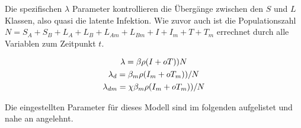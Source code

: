 \documentclass[paper=a4, fontsize=11pt, ngerman, abstract=on]{scrartcl}
\numberwithin{equation}{section} %
\numberwithin{figure}{section} %
\numberwithin{table}{section} %
\begin{document}
Die spezifischen $\lambda$ Parameter kontrollieren die Übergänge zwischen den $S$ und $L$ Klassen, also quasi die latente Infektion. Wie zuvor auch ist die Populationszahl $N = S_{A} + S_{B} + L_{A} + L_{B} + L_{Am} + L_{Bm} + I + I_{m} + T + T_{m}$ errechnet durch alle Variablen zum Zeitpunkt $t$.

\begin{gather*}
  \lambda = \beta \rho (I + oT)) \/ N \\
  \lambda _{d} = \beta_{m} \rho (I_{m} + oT_{m})) / N \\
  \lambda _{dm} = \chi\beta_{m} \rho (I_{m} + oT_{m})) / N \\
\end{gather*}

Die eingestellten Parameter für dieses Modell sind im folgenden aufgelistet und nahe an \cite{Trauer2014} angelehnt.
\end{document}
